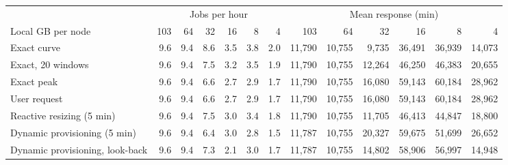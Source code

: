 \begin{tabular}{lrrrrrrrrrrrr}
\toprule
 & \multicolumn{6}{c}{Jobs per hour} & \multicolumn{6}{c}{Mean response (min)} \\
\cmidrule(lr){2-7} \cmidrule(lr){8-13}
Local GB per node & 103 & 64 & 32 & 16 & 8 & 4 & 103 & 64 & 32 & 16 & 8 & 4 \\
\midrule
Exact curve & 9.6 & 9.4 & 8.6 & 3.5 & 3.8 & 2.0 & 11{,}790 & 10{,}755 & 9{,}735 & 36{,}491 & 36{,}939 & 14{,}073 \\
Exact, 20 windows & 9.6 & 9.4 & 7.5 & 3.2 & 3.5 & 1.9 & 11{,}790 & 10{,}755 & 12{,}264 & 46{,}250 & 46{,}383 & 20{,}655 \\
Exact peak & 9.6 & 9.4 & 6.6 & 2.7 & 2.9 & 1.7 & 11{,}790 & 10{,}755 & 16{,}080 & 59{,}143 & 60{,}184 & 28{,}962 \\
User request & 9.6 & 9.4 & 6.6 & 2.7 & 2.9 & 1.7 & 11{,}790 & 10{,}755 & 16{,}080 & 59{,}143 & 60{,}184 & 28{,}962 \\
Reactive resizing (5 min) & 9.6 & 9.4 & 7.5 & 3.0 & 3.4 & 1.8 & 11{,}790 & 10{,}755 & 11{,}705 & 46{,}413 & 44{,}847 & 18{,}800 \\
Dynamic provisioning (5 min) & 9.6 & 9.4 & 6.4 & 3.0 & 2.8 & 1.5 & 11{,}787 & 10{,}755 & 20{,}327 & 59{,}675 & 51{,}699 & 26{,}652 \\
Dynamic provisioning, look-back & 9.6 & 9.4 & 7.3 & 2.1 & 3.0 & 1.7 & 11{,}787 & 10{,}755 & 14{,}802 & 58{,}906 & 56{,}997 & 14{,}948 \\
\bottomrule
\end{tabular}
